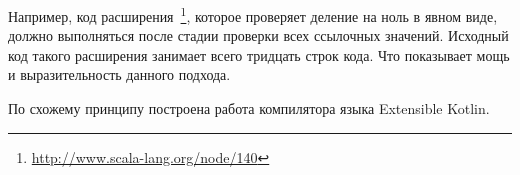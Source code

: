 Например, код расширения~\footnote{\url{http://www.scala-lang.org/node/140}}, которое проверяет деление на ноль в явном виде, должно выполняться после стадии проверки всех ссылочных значений. Исходный код такого расширения занимает всего тридцать строк кода. Что показывает мощь и выразительность данного подхода.

По схожему принципу построена работа компилятора языка Extensible Kotlin.